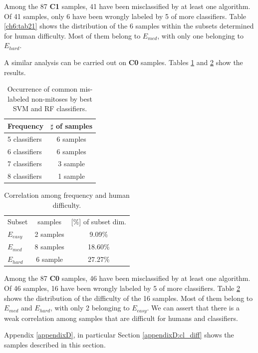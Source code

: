 Among the 87 \textbf{C1} samples, 41 have been misclassified by at least one algorithm. Of 41 samples, only 6 have been wrongly labeled by 5 of more classifiers.
Table \ref{ch6:tab21} shows the distribution of the 6 samples within the subsets determined for human difficulty. Most of them belong to $E_{med}$, with only one belonging to $E_{hard}$.

\vspace{0.2cm}

A similar analysis can be carried out on \textbf{C0} samples. Tables \ref{ch6:tab22} and \ref{ch6:tab23} show the results.


\begin{table}[!hbt]
 \small
 \centering
 \begin{tabular}{lc}
    \toprule
    Frequency        & $\sharp$ of samples \\
    \midrule
     5 classifiers   & 6 samples        \\
     6 classifiers   & 6 samples         \\ 
     7 classifiers   & 3 sample         \\
     8 classifiers  &  1 sample \\
     \bottomrule
 \end{tabular}
 \caption{Occurrence of common mis-labeled non-mitoses by best SVM and RF classifiers.}
 \label{ch6:tab22}
\end{table}


\begin{table}[!hbt]
 \small
 \centering
 \begin{tabular}{lcc}
    \toprule
    Subset        & samples & [\%] of subset dim.  \\
    \cmidrule(lr){1-3}
    $E_{easy}$   & 2 samples &  9.09\% \\
     $E_{med}$    & 8 samples & 18.60\% \\ 
     $E_{hard}$   & 6 sample &  27.27\% \\
     \bottomrule
 \end{tabular}
 \caption{Correlation among frequency and human difficulty.}
 \label{ch6:tab23}
\end{table}


Among the 87 \textbf{C0} samples, 46 have been misclassified by at least one algorithm. Of 46 samples, 16 have been wrongly labeled by 5 of more classifiers.
Table \ref{ch6:tab23} shows the distribution of the difficulty of the 16 samples. Most of them belong to $E_{med}$ and $E_{hard}$, with only 2 belonging to $E_{easy}$.
We can assert that there is a weak correlation among samples that are difficult for humans and classifiers.

\vspace{0.2cm}

Appendix \ref{appendixD}, in particular Section \ref{appendixD:cl_diff} shows the samples described in this section.
